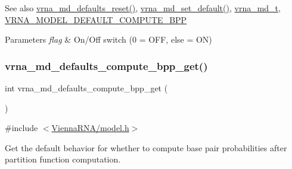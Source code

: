 \begin{DoxySeeAlso}{See also}
\mbox{\hyperlink{group__model__details_ga70834424cf804d149937de89f80ceb45}{vrna\+\_\+md\+\_\+defaults\+\_\+reset()}}, \mbox{\hyperlink{group__model__details_ga8ac6ff84936282436f822644bf841f66}{vrna\+\_\+md\+\_\+set\+\_\+default()}}, \mbox{\hyperlink{group__model__details_ga1f8a10e12a0a1915f2a4eff0b28ea17c}{vrna\+\_\+md\+\_\+t}}, \mbox{\hyperlink{group__model__details_ga1d6cd5051940b126c248147c011bac6c}{V\+R\+N\+A\+\_\+\+M\+O\+D\+E\+L\+\_\+\+D\+E\+F\+A\+U\+L\+T\+\_\+\+C\+O\+M\+P\+U\+T\+E\+\_\+\+B\+PP}} 
\end{DoxySeeAlso}

\begin{DoxyParams}{Parameters}
{\em flag} & On/\+Off switch (0 = O\+FF, else = ON) \\
\hline
\end{DoxyParams}
\mbox{\label{group__model__details_gaa3a537e61fbe0518673bf9f73fd820f3}} 
\subsubsection{\texorpdfstring{vrna\+\_\+md\+\_\+defaults\+\_\+compute\+\_\+bpp\+\_\+get()}{vrna\_md\_defaults\_compute\_bpp\_get()}}
{\footnotesize\ttfamily int vrna\+\_\+md\+\_\+defaults\+\_\+compute\+\_\+bpp\+\_\+get (\begin{DoxyParamCaption}\item[{void}]{ }\end{DoxyParamCaption})}



{\ttfamily \#include $<$\mbox{\hyperlink{model_8h}{Vienna\+R\+N\+A/model.\+h}}$>$}



Get the default behavior for whether to compute base pair probabilities after partition function computation. 

